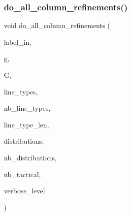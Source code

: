\subsubsection{\texorpdfstring{do\+\_\+all\+\_\+column\+\_\+refinements()}{do\_all\_column\_refinements()}}
{\footnotesize\ttfamily void do\+\_\+all\+\_\+column\+\_\+refinements (\begin{DoxyParamCaption}\item[{\mbox{\hyperlink{galois_8h_ab6cc7b4aeb6ea31aba2b3fbfc83ff5e6}{B\+Y\+TE}} $\ast$}]{label\+\_\+in,  }\item[{ofstream \&}]{g,  }\item[{\mbox{\hyperlink{classtdo__scheme}{tdo\+\_\+scheme}} \&}]{G,  }\item[{\mbox{\hyperlink{galois_8h_a09fddde158a3a20bd2dcadb609de11dc}{I\+NT}} $\ast$}]{line\+\_\+types,  }\item[{\mbox{\hyperlink{galois_8h_a09fddde158a3a20bd2dcadb609de11dc}{I\+NT}}}]{nb\+\_\+line\+\_\+types,  }\item[{\mbox{\hyperlink{galois_8h_a09fddde158a3a20bd2dcadb609de11dc}{I\+NT}}}]{line\+\_\+type\+\_\+len,  }\item[{\mbox{\hyperlink{galois_8h_a09fddde158a3a20bd2dcadb609de11dc}{I\+NT}} $\ast$}]{distributions,  }\item[{\mbox{\hyperlink{galois_8h_a09fddde158a3a20bd2dcadb609de11dc}{I\+NT}}}]{nb\+\_\+distributions,  }\item[{\mbox{\hyperlink{galois_8h_a09fddde158a3a20bd2dcadb609de11dc}{I\+NT}} \&}]{nb\+\_\+tactical,  }\item[{\mbox{\hyperlink{galois_8h_a09fddde158a3a20bd2dcadb609de11dc}{I\+NT}}}]{verbose\+\_\+level }\end{DoxyParamCaption})}

\mbox{\label{tdo__refine__all_8_c_a7b39c862aa7a6ab7707a38dc354b078e}} 
